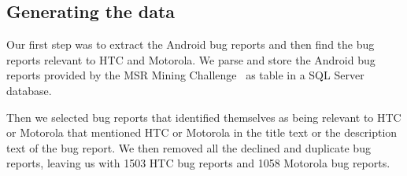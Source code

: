 \documentclass[10pt, conference, compsocconf]{IEEEtran}
\begin{document}
\subsection{Generating the data}


Our first step was to extract the Android bug reports and then find
the bug reports relevant to HTC and Motorola.  We parse and store the
Android bug reports provided by the MSR Mining
Challenge~\cite{MSRChallenge2012} as table in a SQL Server database.


Then we selected bug reports that identified themselves as being
relevant to HTC or Motorola that mentioned HTC or
Motorola in the title text or the description text of the bug report.  
We then removed all the declined and duplicate bug reports, leaving us
with 1503 HTC bug reports and 1058 Motorola bug reports.
\end{document}
